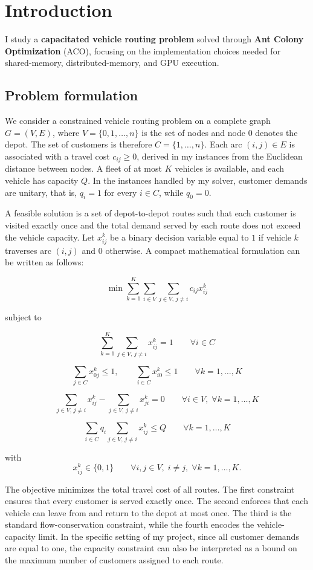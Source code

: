 \section{Introduction}

I study a \textbf{capacitated vehicle routing problem} solved through \textbf{Ant Colony Optimization} (ACO), focusing on the implementation choices needed for shared-memory, distributed-memory, and GPU execution.

\subsection{Problem formulation}

We consider a constrained vehicle routing problem on a complete graph $G=(V,E)$, where $V=\{0,1,\dots,n\}$ is the set of nodes and node $0$ denotes the depot. The set of customers is therefore $C=\{1,\dots,n\}$. Each arc $(i,j) \in E$ is associated with a travel cost $c_{ij} \ge 0$, derived in my instances from the Euclidean distance between nodes. A fleet of at most $K$ vehicles is available, and each vehicle has capacity $Q$. In the instances handled by my solver, customer demands are unitary, that is, $q_i=1$ for every $i \in C$, while $q_0=0$.

A feasible solution is a set of depot-to-depot routes such that each customer is visited exactly once and the total demand served by each route does not exceed the vehicle capacity. Let $x_{ij}^k$ be a binary decision variable equal to $1$ if vehicle $k$ traverses arc $(i,j)$ and $0$ otherwise. A compact mathematical formulation can be written as follows:

\[
\min \sum_{k=1}^{K} \sum_{i \in V} \sum_{j \in V,\, j \ne i} c_{ij} x_{ij}^k
\]

subject to

\[
\sum_{k=1}^{K} \sum_{j \in V,\, j \ne i} x_{ij}^k = 1
\qquad \forall i \in C
\]

\[
\sum_{j \in C} x_{0j}^k \le 1,
\qquad
\sum_{i \in C} x_{i0}^k \le 1
\qquad \forall k=1,\dots,K
\]

\[
\sum_{j \in V,\, j \ne i} x_{ij}^k - \sum_{j \in V,\, j \ne i} x_{ji}^k = 0
\qquad \forall i \in V,\; \forall k=1,\dots,K
\]

\[
\sum_{i \in C} q_i \sum_{j \in V,\, j \ne i} x_{ij}^k \le Q
\qquad \forall k=1,\dots,K
\]

with
\[
x_{ij}^k \in \{0,1\}
\qquad \forall i,j \in V,\; i \ne j,\; \forall k=1,\dots,K.
\]

The objective minimizes the total travel cost of all routes. The first constraint ensures that every customer is served exactly once. The second enforces that each vehicle can leave from and return to the depot at most once. The third is the standard flow-conservation constraint, while the fourth encodes the vehicle-capacity limit. In the specific setting of my project, since all customer demands are equal to one, the capacity constraint can also be interpreted as a bound on the maximum number of customers assigned to each route.

